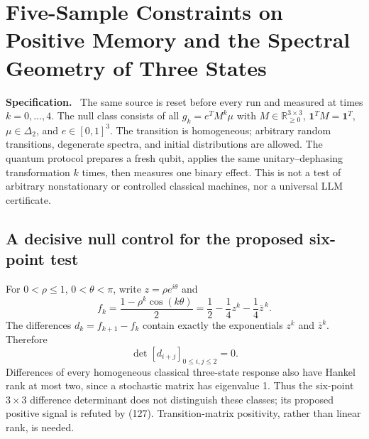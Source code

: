 \documentclass[11pt,a4paper,oneside]{book}
\newcommand{\R}{\mathbb R}\newcommand{\C}{\mathbb C}\newcommand{\Z}{\mathbb Z}\newcommand{\N}{\mathbb N}\newcommand{\Q}{\mathbb Q}
\newcommand{\one}{\mathbf 1}\newcommand{\ii}{\mathrm i}\newcommand{\dd}{\mathrm d}
\newcommand{\note}[1]{\par\medskip\noindent\textbf{#1}\ }
\begin{document}
\chapter{Five-Sample Constraints on Positive Memory and the Spectral Geometry of Three States}
\note{Specification.} The same source is reset before every run and measured at times $k=0,\ldots,4$. The null class consists of all $g_k=e^TM^k\mu$ with $M\in\R_{\ge0}^{3\times3}$, $\one^TM=\one^T$, $\mu\in\Delta_2$, and $e\in[0,1]^3$. The transition is homogeneous; arbitrary random transitions, degenerate spectra, and initial distributions are allowed. The quantum protocol prepares a fresh qubit, applies the same unitary--dephasing transformation $k$ times, then measures one binary effect. This is not a test of arbitrary nonstationary or controlled classical machines, nor a universal LLM certificate.
\section{A decisive null control for the proposed six-point test}
For $0<\rho\le1$, $0<\theta<\pi$, write $z=\rho e^{i\theta}$ and
\begin{equation}f_k=\frac{1-\rho^k\cos(k\theta)}2=\frac12-\frac14z^k-\frac14\bar z^{\,k}.\tag{126}\end{equation}
The differences $d_k=f_{k+1}-f_k$ contain exactly the exponentials $z^k$ and $\bar z^k$. Therefore
\begin{equation}\det[d_{i+j}]_{0\le i,j\le2}=0.\tag{127}\end{equation}
Differences of every homogeneous classical three-state response also have Hankel rank at most two, since a stochastic matrix has eigenvalue 1. Thus the six-point $3\times3$ difference determinant does not distinguish these classes; its proposed positive signal is refuted by (127). Transition-matrix positivity, rather than linear rank, is needed.
\end{document}
